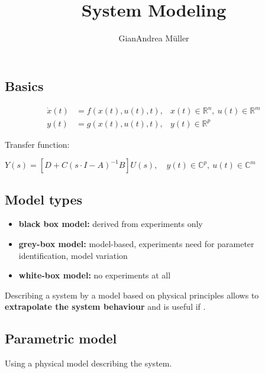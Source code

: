 \documentclass[10pt,a4paper]{scrartcl}
\title{System Modeling}
\author{GianAndrea Müller}
\begin{document}
\begin{multicols*}{4}
\maketitle
\tableofcontents
\end{multicols*}

\newpage

\begin{multicols*}{3}

\section{Basics}


\begin{align*}
\dot{x}(t)&=f(x(t),u(t),t),&x(t)\in\mathbb{R}^n,\ u(t)\in\mathbb{R}^m\\
y(t)&=g(x(t),u(t),t),&y(t)\in\mathbb{R}^p
\end{align*}


Transfer function:

\small
$Y(s)=\left[D+C(s\cdot I-A)^{-1}B\right]U(s),\quad y(t)\in\mathbb{C}^p,\ u(t)\in\mathbb{C}^m$\normalsize

\subsection{Model types}

\begin{itemize}
\item \textbf{black box model:} derived from experiments only
\item \textbf{grey-box model:} model-based, experiments need for parameter identification, model variation
\item \textbf{white-box model:} no experiments at all
\end{itemize}

Describing a system by a model based on physical principles allows to \textbf{extrapolate the system behaviour} and is useful if .

\subsection{Parametric model}

Using a physical model describing the system.




\end{multicols*}
\end{document}
